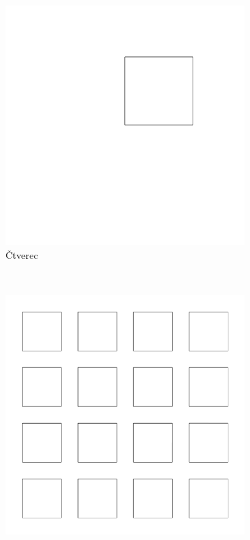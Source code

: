 \begin{figure}[H]
  \centering

  \begin{subfigure}{0.3\textwidth}
    \centering
    \includegraphics[width=\textwidth]{krunimir/examples/square1}
    \caption{Čtverec}\label{fig:krunimir-square1}
  \end{subfigure}
  ~
  \begin{subfigure}{0.3\textwidth}
    \centering
    \includegraphics[width=\textwidth]{krunimir/examples/squares}

\end{subfigure}
\end{figure}
